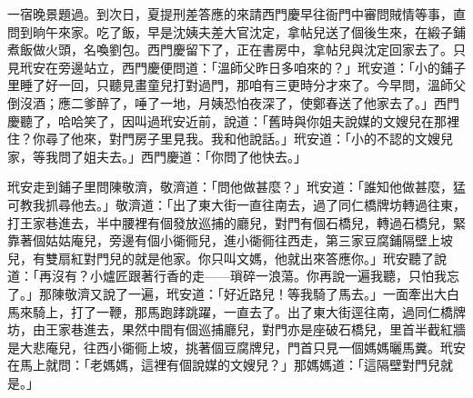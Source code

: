 一宿晚景題過。到次日，夏提刑差答應的來請西門慶早往衙門中審問賊情等事，直問到晌午來家。吃了飯，早是沈姨夫差大官沈定，拿帖兒送了個後生來，在緞子鋪煮飯做火頭，名喚劉包。西門慶留下了，正在書房中，拿帖兒與沈定回家去了。只見玳安在旁邊站立，西門慶便問道：「溫師父昨日多咱來的？」玳安道：「小的鋪子里睡了好一回，只聽見畫童兒打對過門，那咱有三更時分才來了。今早問，溫師父倒沒酒；應二爹醉了，唾了一地，月姨恐怕夜深了，使鄭春送了他家去了。」西門慶聽了，哈哈笑了，因叫過玳安近前，說道：「舊時與你姐夫說媒的文嫂兒在那裡住？你尋了他來，對門房子里見我。我和他說話。」玳安道：「小的不認的文嫂兒家，等我問了姐夫去。」西門慶道：「你問了他快去。」

玳安走到鋪子里問陳敬濟，敬濟道：「問他做甚麼？」玳安道：「誰知他做甚麼，猛可教我抓尋他去。」敬濟道：「出了東大街一直往南去，過了同仁橋牌坊轉過往東，打王家巷進去，半中腰裡有個發放巡捕的廳兒，對門有個石橋兒，轉過石橋兒，緊靠著個姑姑庵兒，旁邊有個小衚衕兒，進小衚衕往西走，第三家豆腐鋪隔壁上坡兒，有雙扇紅對門兒的就是他家。你只叫文媽，他就出來答應你。」玳安聽了說道：「再沒有？小爐匠跟著行香的走——瑣碎一浪蕩。你再說一遍我聽，只怕我忘了。」那陳敬濟又說了一遍，玳安道：「好近路兒！等我騎了馬去。」一面牽出大白馬來騎上，打了一鞭，那馬跑踍跳躍，一直去了。出了東大街逕往南，過同仁橋牌坊，由王家巷進去，果然中間有個巡捕廳兒，對門亦是座破石橋兒，里首半截紅牆是大悲庵兒，往西小衚衕上坡，挑著個豆腐牌兒，門首只見一個媽媽曬馬糞。玳安在馬上就問：「老媽媽，這裡有個說媒的文嫂兒？」那媽媽道：「這隔壁對門兒就是。」

